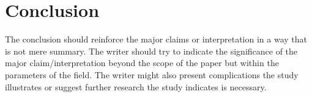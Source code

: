 \section{Conclusion}

The conclusion should reinforce the major claims or interpretation in a way that is not mere summary. The writer should try to indicate the significance of the major claim/interpretation beyond the scope of the paper but within the parameters of the field. The writer might also present complications the study illustrates or suggest further research the study indicates is necessary.